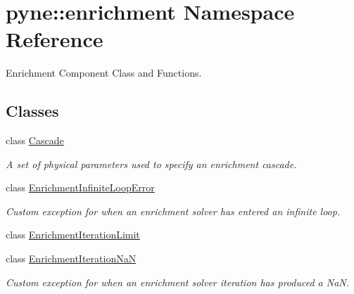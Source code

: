 \hypertarget{namespacepyne_1_1enrichment}{\section{pyne\+:\+:enrichment Namespace Reference}
\label{namespacepyne_1_1enrichment}
}


Enrichment Component Class and Functions.  


\subsection*{Classes}
\begin{DoxyCompactItemize}
\item 
class \hyperlink{classpyne_1_1enrichment_1_1_cascade}{Cascade}
\begin{DoxyCompactList}\small\item\em A set of physical parameters used to specify an enrichment cascade. \end{DoxyCompactList}\item 
class \hyperlink{classpyne_1_1enrichment_1_1_enrichment_infinite_loop_error}{Enrichment\+Infinite\+Loop\+Error}
\begin{DoxyCompactList}\small\item\em Custom exception for when an enrichment solver has entered an infinite loop. \end{DoxyCompactList}\item 
class \hyperlink{classpyne_1_1enrichment_1_1_enrichment_iteration_limit}{Enrichment\+Iteration\+Limit}
\item 
class \hyperlink{classpyne_1_1enrichment_1_1_enrichment_iteration_na_n}{Enrichment\+Iteration\+Na\+N}
\begin{DoxyCompactList}\small\item\em Custom exception for when an enrichment solver iteration has produced a Na\+N. \end{DoxyCompactList}\end{DoxyCompactItemize}
